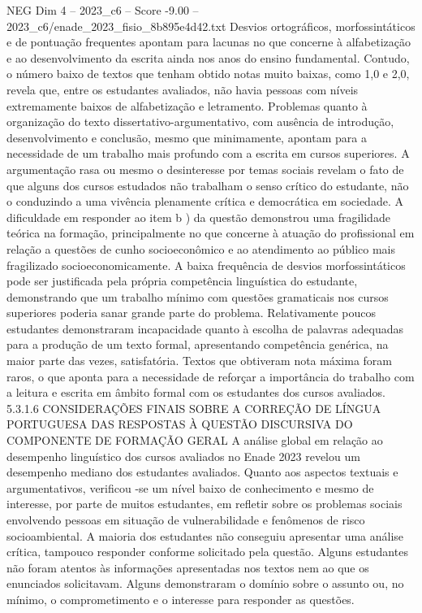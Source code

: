 \begin{textsample}{NEG Dim 4 – 2023\_c6 – Score -9.00 – 2023\_c6/enade\_2023\_fisio\_8b895e4d42.txt}
Desvios ortográficos, morfossintáticos e de pontuação frequentes apontam para lacunas no que concerne à alfabetização e ao desenvolvimento da escrita ainda nos anos do ensino fundamental.
Contudo, o número baixo de textos que tenham obtido notas muito baixas, como 1,0 e 2,0, revela que, entre os estudantes avaliados, não havia pessoas com níveis extremamente baixos de alfabetização e letramento.
Problemas quanto à organização do texto dissertativo-argumentativo, com ausência de introdução, desenvolvimento e conclusão, mesmo que minimamente, apontam para a necessidade de um trabalho mais profundo com a escrita em cursos superiores.
A argumentação rasa ou mesmo o desinteresse por temas sociais revelam o fato de que alguns dos cursos estudados não trabalham o senso crítico do estudante, não o conduzindo a uma vivência plenamente crítica e democrática em sociedade.
A dificuldade em responder ao item b ) da questão demonstrou uma fragilidade teórica na formação, principalmente no que concerne à atuação do profissional em relação a questões de cunho socioeconômico e ao atendimento ao público mais fragilizado socioeconomicamente.
A baixa frequência de desvios morfossintáticos pode ser justificada pela própria competência linguística do estudante, demonstrando que um trabalho mínimo com questões gramaticais nos cursos superiores poderia sanar grande parte do problema.
Relativamente poucos estudantes demonstraram incapacidade quanto à escolha de palavras adequadas para a produção de um texto formal, apresentando competência genérica, na maior parte das vezes, satisfatória.
Textos que obtiveram nota máxima foram raros, o que aponta para a necessidade de reforçar a importância do trabalho com a leitura e escrita em âmbito formal com os estudantes dos cursos avaliados. 5.3.1.6 CONSIDERAÇÕES FINAIS SOBRE A CORREÇÃO DE LÍNGUA PORTUGUESA DAS RESPOSTAS À QUESTÃO DISCURSIVA DO COMPONENTE DE FORMAÇÃO GERAL A análise global em relação ao desempenho linguístico dos cursos avaliados no Enade 2023 revelou um desempenho mediano dos estudantes avaliados.
Quanto aos aspectos textuais e argumentativos, verificou -se um nível baixo de conhecimento e mesmo de interesse, por parte de muitos estudantes, em refletir sobre os problemas sociais envolvendo pessoas em situação de vulnerabilidade e fenômenos de risco socioambiental.
A maioria dos estudantes não conseguiu apresentar uma análise crítica, tampouco responder conforme solicitado pela questão.
Alguns estudantes não foram atentos às informações apresentadas nos textos nem ao que os enunciados solicitavam.
Alguns demonstraram o domínio sobre o assunto ou, no mínimo, o comprometimento e o interesse para responder as questões.

\end{textsample}
